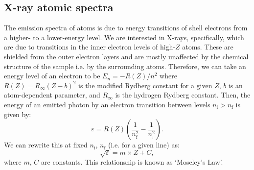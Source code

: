 \documentclass[11pt,a4paper,twoside,onecolumn]{article}
\newcommand{\rydberg}{R}
\begin{document}
\subsection{X-ray atomic spectra}
The emission spectra of atoms is due to energy transitions of shell electrons from a higher- to a lower-energy level. We are interested in X-rays, specifically, which are due to transitions in the inner electron levels of high-$Z$ atoms. These are shielded from the outer electron layers and are mostly unaffected by the chemical structure of the sample i.e. by the surrounding atoms. Therefore, we can take an energy level of an electron to be $E_n = -\rydberg\left(Z\right) / n^2$ where $\rydberg \left(Z\right)= \rydberg_\infty \left(Z - b\right)^2$ is the modified Rydberg constant for a given $Z$, $b$ is an atom-dependent parameter, and $\rydberg_\infty$ is the hydrogen Rydberg constant. Then, the energy of an emitted photon by an electron transition between levels $n_\mathrm{i} > n_\mathrm{f}$ is given by:
\begin{equation}\label{eqn:x-ray-energy}
    \varepsilon = \rydberg\left(Z\right) \left(\frac{1}{n_\mathrm{f}^2} - \frac{1}{n_\mathrm{i}^2}\right).
\end{equation}
We can rewrite this at fixed $n_\mathrm{i}$, $n_\mathrm{f}$ (i.e. for a given line) as:
\begin{equation}\label{eqn:moseleys-eqn}
    \sqrt{\varepsilon} = m \times Z + C,
\end{equation}  where $m$, $C$ are constants. This relationship is known as `Moseley's Law'.
\end{document}

